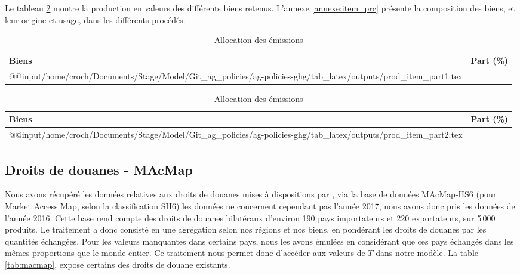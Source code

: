 Le tableau \ref{tab:prod_item} montre la production en valeurs des différents biens retenus. L'annexe \ref{annexe:item_prc} présente la composition des biens, et leur origine et usage, dans les différents procédés.


\begin{table}[h]
    \centering
    \begin{threeparttable}
        \begin{minipage}[t]{0.49\textwidth}
            \centering
            \begin{tabularx}{\textwidth}{p{1.8in}c}
                \textbf{Biens} & \textbf{Part (\%)} \\ \hline
                \csname @@input\endcsname /home/croch/Documents/Stage/Model/Git_ag_policies/ag-policies-ghg/tab_latex/outputs/prod_item_part1.tex
                \hline
            \end{tabularx}
        \end{minipage}
        \begin{minipage}[t]{0.49\textwidth}
            \centering
            \begin{tabularx}{\textwidth}{p{2in}c}
                \textbf{Biens} & \textbf{Part (\%)}                                                                                               \\ \hline
                \csname @@input\endcsname /home/croch/Documents/Stage/Model/Git_ag_policies/ag-policies-ghg/tab_latex/outputs/prod_item_part2.tex \\
                \hline
            \end{tabularx}
        \end{minipage}
        \caption{Allocation des émissions}
        \label{tab:prod_item}
    \end{threeparttable}
\end{table}

\subsection{Droits de douanes - MAcMap}

Nous avons récupéré les données relatives aux droits de douanes mises à dispositions par \cite{Guimbard2012}, via la base de données MAcMap-HS6 (pour Market Access Map, selon la classification SH6) les données ne concernent cependant pas l'année 2017, nous avons donc pris les données de l'année 2016. Cette base rend compte des droits de douanes bilatéraux d'environ 190 pays importateurs et 220 exportateurs, sur 5\,000 produits. Le traitement a donc consisté en une agrégation selon nos régions et nos biens, en pondérant les droits de douanes par les quantités échangées. Pour les valeurs manquantes dans certains pays, nous les avons émulées en considérant que ces pays échangés dans les mêmes proportions que le monde entier. Ce traitement nous permet donc d'accéder aux valeurs de $T$ dans notre modèle. La table \ref{tab:macmap}, expose certains des droits de douane existants.


